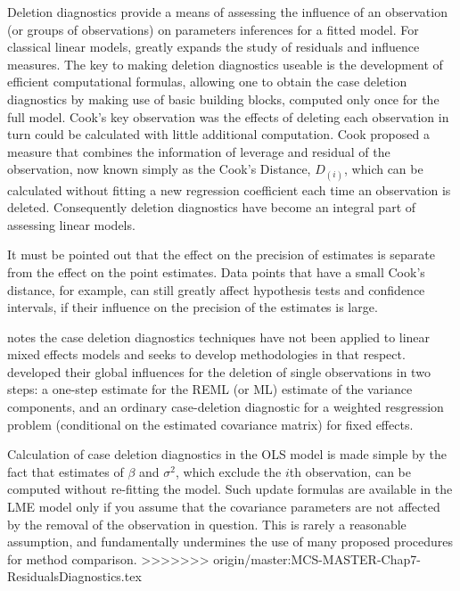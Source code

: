 \documentclass[12pt, a4paper]{report}
\theoremstyle{plain}
\theoremstyle{definition}
\theoremstyle{remark}
\begin{document}
	
	Deletion diagnostics provide a means of assessing the influence of an observation (or groups of observations) on parameters inferences for a fitted model. For classical linear models, \citet{cook77} greatly expands the study of residuals and influence measures. The key to making deletion diagnostics useable is the development of efficient computational formulas, allowing one to obtain the  case deletion diagnostics by making use of basic building blocks, computed only once for the full model.
	Cook's key observation was the effects of deleting each observation in turn could be calculated with little additional computation. Cook proposed a measure that combines the information of leverage and residual of the observation, now known simply as the Cook's Distance, $D_{(i)}$, which can be calculated without fitting a new regression coefficient each time an observation is deleted. Consequently deletion diagnostics have become an integral part of assessing linear models.
	
	
	
	It must be pointed out that the effect on the precision of estimates is separate from the effect on the point estimates. Data points that have a small Cook's distance, for example, can still greatly affect hypothesis tests and confidence intervals, if their 
	influence on the precision of the estimates is large.	
	
	\citet{Christensen} notes the case deletion diagnostics techniques have not been applied to linear mixed effects models and seeks to develop methodologies in that respect. \citet{Christensen} developed their global influences for the deletion of single observations in two steps: a one-step estimate for the REML (or ML) estimate of the variance components, and an ordinary case-deletion diagnostic for a weighted resgression problem (conditional on the estimated covariance matrix) for fixed effects.
	
Calculation of case deletion diagnostics in the OLS model is made simple by the fact that estimates of $\beta$ and $\sigma^2$, which exclude the $i$th observation, can be computed without re-fitting the model. Such update formulas are available in the LME model only if you assume that the covariance parameters are not affected by the removal of the observation in question. This is rarely a reasonable assumption, and fundamentally undermines the use of many proposed procedures for method comparison.
>>>>>>> origin/master:MCS-MASTER-Chap7-ResidualsDiagnostics.tex
	
\end{document}
